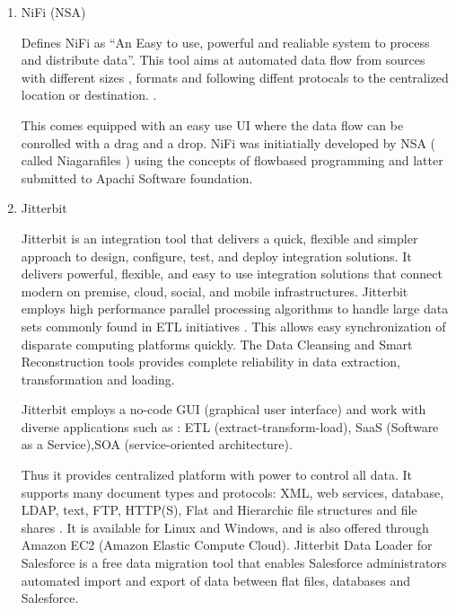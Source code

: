 \begin{enumerate}
\item {} 
NiFi (NSA)

\label{\detokenize{i524/technologies:id52}}{\hyperref[\detokenize{i524/technologies:www-nifi}]{\sphinxcrossref{{[}44{]}}}} Defines NiFi as ``An Easy to use, powerful and
realiable system to process and distribute data''.  This tool aims
at automated data flow from sources with different sizes , formats
and following diffent protocals to the centralized location or
destination. \label{\detokenize{i524/technologies:id53}}{\hyperref[\detokenize{i524/technologies:www-hortanworks}]{\sphinxcrossref{{[}45{]}}}}.

This comes equipped with an easy use UI where the data flow can be
conrolled with a drag and a drop.  NiFi was initiatially developed
by NSA ( called Niagarafiles ) using the concepts of flowbased
programming and latter submitted to Apachi Software
foundation. \label{\detokenize{i524/technologies:id54}}{\hyperref[\detokenize{i524/technologies:www-forbes}]{\sphinxcrossref{{[}46{]}}}}

\item {} 
Jitterbit

Jitterbit \label{\detokenize{i524/technologies:id55}}{\hyperref[\detokenize{i524/technologies:datasheet}]{\sphinxcrossref{{[}47{]}}}} is an integration tool that delivers a
quick, flexible and simpler approach to design, configure, test,
and deploy integration solutions. It delivers powerful, flexible,
and easy to use integration solutions that connect modern on
premise, cloud, social, and mobile infrastructures. Jitterbit
employs high performance parallel processing algorithms to handle
large data sets commonly found in ETL initiatives
\label{\detokenize{i524/technologies:id56}}{\hyperref[\detokenize{i524/technologies:www-jitetl}]{\sphinxcrossref{{[}48{]}}}}. This allows easy synchronization of disparate
computing platforms quickly. The Data Cleansing and Smart
Reconstruction tools provides complete reliability in data
extraction, transformation and loading.

Jitterbit employs a no-code GUI (graphical user interface) and
work with diverse applications such as : ETL
(extract-transform-load), SaaS (Software as a Service),SOA
(service-oriented architecture).

Thus it provides centralized platform with power to control all
data. It supports many document types and protocols: XML, web
services, database, LDAP, text, FTP, HTTP(S), Flat and Hierarchic
file structures and file shares \label{\detokenize{i524/technologies:id57}}{\hyperref[\detokenize{i524/technologies:tech-manual}]{\sphinxcrossref{{[}49{]}}}}. It is
available for Linux and Windows, and is also offered through
Amazon EC2 (Amazon Elastic Compute Cloud). Jitterbit Data Loader
for Salesforce is a free data migration tool that enables
Salesforce administrators automated import and export of data
between flat files, databases and Salesforce.


\end{enumerate}
